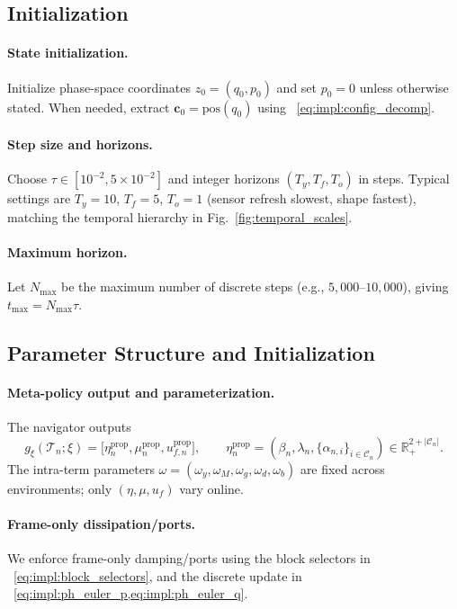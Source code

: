 \documentclass{article} %
\let\vec=\boldsymbol
\begin{document}
\subsection{Initialization}
\label{subsec:initialization}

\paragraph{State initialization.}
Initialize phase-space coordinates $z_0=(q_0,p_0)$ and set $p_0=0$ unless otherwise stated. When needed,
extract $\vec c_0=\mathrm{pos}(q_0)$ using ~\cref{eq:impl:config_decomp}.

\paragraph{Step size and horizons.}
Choose $\tau \in [10^{-2},5{\times}10^{-2}]$ and integer horizons $(T_y,T_f,T_o)$ in steps.
Typical settings are $T_y{=}10$, $T_f{=}5$, $T_o{=}1$ (sensor refresh slowest, shape fastest),
matching the temporal hierarchy in Fig.~\ref{fig:temporal_scales}.

\paragraph{Maximum horizon.}
Let $N_{\max}$ be the maximum number of discrete steps (e.g., $5{,}000$--$10{,}000$), giving
$t_{\max}=N_{\max}\tau$.

\subsection{Parameter Structure and Initialization}
\label{subsec:parameter_structure}

\paragraph{Meta-policy output and parameterization.}
The navigator outputs
\[
g_\xi(\mathcal{T}_n;\xi)=\big[\eta_n^{\mathrm{prop}},\mu_n^{\mathrm{prop}},u_{f,n}^{\mathrm{prop}}\big],
\qquad
\eta_n^{\mathrm{prop}}=(\beta_n,\lambda_n,\{\alpha_{n,i}\}_{i\in\mathcal{C}_n})\in\mathbb{R}_+^{2+|\mathcal{C}_n|}.
\]
The intra-term parameters $\omega=(\omega_y,\omega_M,\omega_g,\omega_d,\omega_b)$ are fixed across environments;
only $(\eta,\mu,u_f)$ vary online.

\paragraph{Frame-only dissipation/ports.}
We enforce frame-only damping/ports using the block selectors in ~\cref{eq:impl:block_selectors},
and the discrete update in ~\cref{eq:impl:ph_euler_p,eq:impl:ph_euler_q}.
\end{document}
